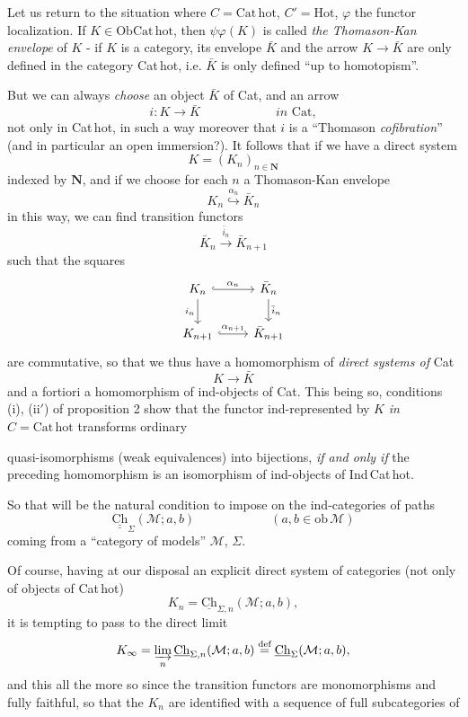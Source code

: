 \documentclass[11pt]{article}
\newcommand{\printedpage}[1]{\marginpar{\footnotesize p.~#1}}
\newcommand{\msp}[1]{\marginpar{\footnotesize [#1]}}
\newcommand{\Cat}{\mathrm{Cat}}
\newcommand{\Cathot}{\mathrm{Cat\,hot}}
\newcommand{\Hot}{\mathrm{Hot}}
\newcommand{\Ob}{\mathrm{Ob}}
\newcommand{\Ch}{\mathrm{Ch}}
\newcommand{\Chh}{\underline{\underline{\mathrm{Ch}}}}
\begin{document}
Let us return to the situation where $C = \Cathot$, $C' = \Hot$, $\varphi$ the functor localization. If $K \in \Ob\Cathot$, then $\psi\varphi(K)$ is called \textit{the Thomason-Kan envelope} of $K$ - if $K$ is a category, its envelope $\bar{K}$ and the arrow $K \longrightarrow \bar{K}$ are only defined in the category Cat\,hot, i.e. $\bar{K}$ is only defined ``up to homotopism''. %

\noindent\msp{page 43}%
But we can always \textit{choose} an object $\bar{K}$ of Cat, and an arrow
\[
i : K \longrightarrow \bar{K} \qquad\qquad\qquad \textit{in } \Cat,
\]
\printedpage{28}
not only in Cat\,hot, in such a way moreover that $i$ is a ``Thomason \textit{cofibration}'' (and in particular an open immersion?). It follows that if we have a direct system
\[
K = (K_n)_{n\in\mathbf{N}}
\]
indexed by $\mathbf{N}$, and if we choose for each $n$ a Thomason-Kan envelope
\[
K_n \overset{\alpha_n}{\hookrightarrow} \bar{K}_n
\]
in this way, we can find transition functors
\[
\bar{K}_n \xrightarrow{\bar{i}_n} \bar{K}_{n+1}
\]
such that the squares
\[
\begin{tikzcd}
K_n \arrow[r,hook,"\alpha_n"] \arrow[d,"i_n"'] & \bar{K}_n \arrow[d,"\bar{i}_n"] \\
K_{n+1} \arrow[r,hook,"\alpha_{n+1}"] & \bar{K}_{n+1}
\end{tikzcd}
\]
are commutative, so that we thus have a homomorphism of \textit{direct systems of} Cat
\[
K \longrightarrow \bar{K}
\]
and a fortiori a homomorphism of ind-objects of Cat. This being so, conditions (i), (ii$'$) of proposition 2 show that the functor ind-represented by $K$ \textit{in} $C = \Cathot$ transforms ordinary

\noindent\msp{page 44}%
quasi-isomorphisms (weak equivalences) into bijections, \textit{if and only if} the preceding homomorphism is an isomorphism of ind-objects of Ind\,Cat\,hot.

So that will be the natural condition to impose on the ind-categories of paths
\[
\Chh_{\Sigma}(\mathcal{M};a,b) \qquad\qquad\qquad (a,b \in \mathrm{ob}\,\mathcal{M})
\]
coming from a ``category of models'' $\mathcal{M}$, $\Sigma$.

Of course, having at our disposal an explicit direct system of categories (not only of objects of Cat\,hot)
\[
K_n = \underline{\Ch}_{\Sigma,n}(\mathcal{M};a,b),
\]
it is tempting to pass to the direct limit
\[
K_\infty = \varinjlim_n \underline{\Ch}_{\Sigma,n}(\mathcal{M};a,b) \overset{\text{def}}{=} \underline{\Ch}_{\Sigma}(\mathcal{M};a,b),
\]
and this all the more so since the transition functors are monomorphisms and fully faithful, so that the $K_n$ are identified with a sequence of full subcategories of
\end{document}
